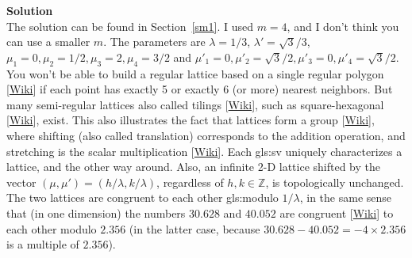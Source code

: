 \documentclass[10pt]{article}
\begin{document}
\begin{Exercise}
{\bf Solution} \vspace{1ex}\\
The solution can be found in Section~\ref{sm1}. I used $m=4$, and I don't think you can use a smaller $m$. The parameters are
$\lambda=1/3$, $\lambda'=\sqrt{3}/3$, $\mu_1=0, \mu_2=1/2, \mu_3=2, \mu_4=3/2 $ and $\mu'_1=0, \mu'_2=\sqrt{3}/2, \mu'_3=0, \mu'_4=\sqrt{3}/2$. You won't be able to build a regular lattice based on a
single regular polygon [\href{https://en.wikipedia.org/wiki/Regular_polygon}{Wiki}] if each point has exactly 5 or exactly 6 (or more) nearest neighbors. But many \textcolor{index}{semi-regular lattices} also called
\textcolor{index}{tilings}
[\href{https://en.wikipedia.org/wiki/Euclidean_tilings_by_convex_regular_polygons}{Wiki}],
such as square-hexagonal [\href{https://en.wikipedia.org/wiki/Truncated_square_tiling}{Wiki}], exist.
This also illustrates the fact that lattices form
a \textcolor{index}{group} [\href{https://en.wikipedia.org/wiki/Lattice_(group)}{Wiki}], where shifting (also called translation) corresponds to the addition operation, and stretching
is the scalar multiplication [\href{https://en.wikipedia.org/wiki/Scalar_multiplication}{Wiki}].  Each \gls{gls:sv} uniquely characterizes a lattice, and the other way around. Also, an infinite 2-D lattice shifted by the vector
$(\mu,\mu')=(h/\lambda,k/\lambda)$, regardless of $h,k\in\mathbb{Z}$, is topologically unchanged. The two lattices are
\textcolor{index}{congruent} to each other \gls{gls:modulo} $1/\lambda$, in the same sense that (in one dimension) the numbers $30.628$ and $40.052$ are congruent
 [\href{https://en.wikipedia.org/wiki/Modular_arithmetic}{Wiki}] to each other modulo $2.356$ (in the latter case, because
$30.628 - 40.052 = -4\times 2.356$ is a multiple of $2.356$).
\end{Exercise}
\end{document}
